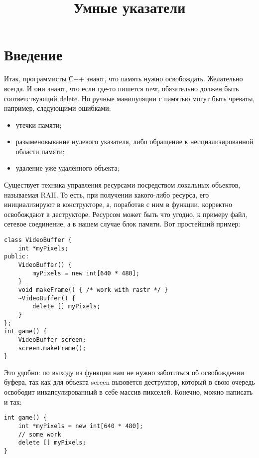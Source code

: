 ﻿\documentclass {article}
\date{}
\title{{Умные указатели}}
\begin{document}
\maketitle
\section{Введение}
Итак, программисты С++ знают, что память нужно освобождать. Желательно всегда. И они знают, что если где-то пишется new, обязательно должен быть соответствующий delete. Но ручные манипуляции с памятью могут быть чреваты, например, следующими ошибками:
\begin{itemize}
\item утечки памяти;
\item разыменовывание нулевого указателя, либо обращение к неициализированной области памяти;
\item удаление уже удаленного объекта;
\end{itemize}
Существует техника управления ресурсами посредством локальных объектов, называемая RAII. То есть, при получении какого-либо ресурса, его инициализируют в конструкторе, а, поработав с ним в функции, корректно освобождают в деструкторе. Ресурсом может быть что угодно, к примеру файл, сетевое соединение, а в нашем случае блок памяти. Вот простейший пример:
\begin{lstlisting}[caption=Пример]
class VideoBuffer {
    int *myPixels;
public:
    VideoBuffer() {
        myPixels = new int[640 * 480];
    }
    void makeFrame() { /* work with rastr */ }
    ~VideoBuffer() {
        delete [] myPixels;
    }
};
int game() {
    VideoBuffer screen;
    screen.makeFrame();
}
\end{lstlisting}
Это удобно: по выходу из функции нам не нужно заботиться об освобождении буфера, так как для объекта screen вызовется деструктор, который в свою очередь освободит инкапсулированный в себе массив пикселей. Конечно, можно написать и так:
\begin{lstlisting}[caption=Пример]
int game() {
    int *myPixels = new int[640 * 480];
    // some work
    delete [] myPixels;
}
\end{lstlisting}
\end{document}
